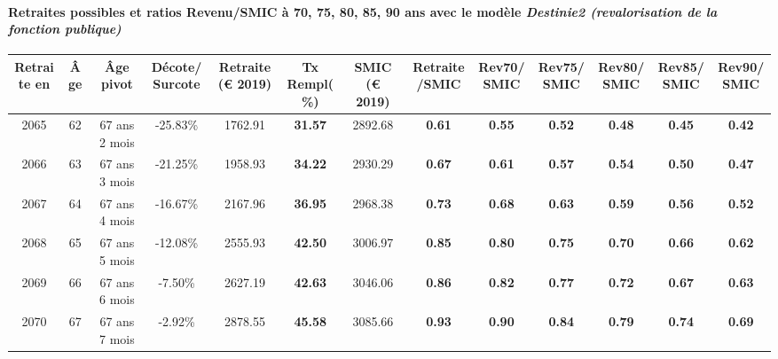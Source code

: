 \paragraph{Retraites possibles et ratios Revenu/SMIC à 70, 75, 80, 85, 90 ans avec le modèle \emph{Destinie2 (revalorisation de la fonction publique)}}  
 
{ \scriptsize \begin{center} 
\begin{tabular}[htb]{|c|c||c|c||c|c||c||c|c|c|c|c|c|} 
\hline 
 Retraite en &  Âge &  Âge pivot &  Décote/Surcote &  Retraite (\euro{} 2019) &  Tx Rempl(\%) &  SMIC (\euro{} 2019) &  Retraite/SMIC &  Rev70/SMIC &  Rev75/SMIC &  Rev80/SMIC &  Rev85/SMIC &  Rev90/SMIC \\ 
\hline \hline 
 2065 &  62 &  67 ans 2 mois &  -25.83\% &  1762.91 &  {\bf 31.57} &  2892.68 &  {\bf {\color{red} 0.61}} &  {\bf {\color{red} 0.55}} &  {\bf {\color{red} 0.52}} &  {\bf {\color{red} 0.48}} &  {\bf {\color{red} 0.45}} &  {\bf {\color{red} 0.42}} \\ 
\hline 
 2066 &  63 &  67 ans 3 mois &  -21.25\% &  1958.93 &  {\bf 34.22} &  2930.29 &  {\bf {\color{red} 0.67}} &  {\bf {\color{red} 0.61}} &  {\bf {\color{red} 0.57}} &  {\bf {\color{red} 0.54}} &  {\bf {\color{red} 0.50}} &  {\bf {\color{red} 0.47}} \\ 
\hline 
 2067 &  64 &  67 ans 4 mois &  -16.67\% &  2167.96 &  {\bf 36.95} &  2968.38 &  {\bf {\color{red} 0.73}} &  {\bf {\color{red} 0.68}} &  {\bf {\color{red} 0.63}} &  {\bf {\color{red} 0.59}} &  {\bf {\color{red} 0.56}} &  {\bf {\color{red} 0.52}} \\ 
\hline 
 2068 &  65 &  67 ans 5 mois &  -12.08\% &  2555.93 &  {\bf 42.50} &  3006.97 &  {\bf {\color{red} 0.85}} &  {\bf {\color{red} 0.80}} &  {\bf {\color{red} 0.75}} &  {\bf {\color{red} 0.70}} &  {\bf {\color{red} 0.66}} &  {\bf {\color{red} 0.62}} \\ 
\hline 
 2069 &  66 &  67 ans 6 mois &  -7.50\% &  2627.19 &  {\bf 42.63} &  3046.06 &  {\bf {\color{red} 0.86}} &  {\bf {\color{red} 0.82}} &  {\bf {\color{red} 0.77}} &  {\bf {\color{red} 0.72}} &  {\bf {\color{red} 0.67}} &  {\bf {\color{red} 0.63}} \\ 
\hline 
 2070 &  67 &  67 ans 7 mois &  -2.92\% &  2878.55 &  {\bf 45.58} &  3085.66 &  {\bf {\color{red} 0.93}} &  {\bf {\color{red} 0.90}} &  {\bf {\color{red} 0.84}} &  {\bf {\color{red} 0.79}} &  {\bf {\color{red} 0.74}} &  {\bf {\color{red} 0.69}} \\ 
\hline 
\hline 
\end{tabular} 
\end{center} } 

